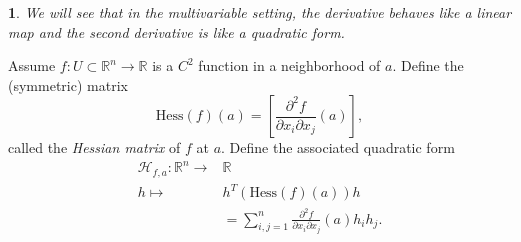 \documentclass[12pt]{article}
\newtheorem{para}[theorem]{}
\begin{document}
\begin{para} 
	We will see that in the multivariable setting, the derivative behaves like a linear map and the second derivative is like a quadratic form.
\end{para}	

\begin{definition}
	Assume $f:U\subset\mathbb{R}^n\to\mathbb{R}$ is a $C^2$ function in a neighborhood of $a$. Define the (symmetric) matrix 
	\begin{equation*}
		\text{Hess}(f)(a) = \left[ \frac{\partial^2f}{\partial x_i\partial x_j}(a) \right],
	\end{equation*}
	called the \emph{Hessian matrix} of $f$ at $a$. Define the associated quadratic form 
	\begin{align*}
		\mathcal{H}_{f,a}:\mathbb{R}^n\to& \mathbb{R} \\
		h \mapsto& h^T(\text{Hess}(f)(a))h \\
				 & = \sum_{i,j=1}^n \frac{\partial^2f}{\partial x_i\partial x_j}(a)h_ih_j.
	\end{align*}
\end{definition}
\end{document}
